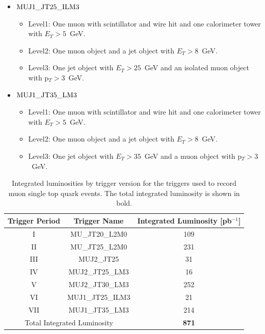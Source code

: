 \begin{itemize}
\item $\rm{MUJ1\_JT25\_ILM3}$
\begin{itemize}
\item Level1: One muon with scintillator and wire hit and one calorimeter tower with $E_{T}>5$~GeV.
\item Level2: One muon object and a jet object with $E_{T}>8$~GeV.
\item Level3: One jet object with $E_{T}>25$~GeV and an isolated muon object with p$_{T}>3$~GeV.
\end{itemize}
\item $\rm{MUJ1\_JT35\_LM3}$
\begin{itemize}
\item Level1: One muon with scintillator and wire hit and one calorimeter tower with $E_{T}>5$~GeV.
\item Level2: One muon object and a jet object with $E_{T}>8$~GeV.
\item Level3: One jet object with $E_{T}>35$~GeV and a muon object with p$_{T}>3$~GeV.
\end{itemize}
\end{itemize}

\vspace{0.2in}
\begin{table}[!h!tbp]
\begin{center}
\caption{Integrated luminosities by trigger version for the triggers used to record muon single top quark events. The total integrated luminosity is shown in bold.}
\label{muontrigger}
\begin{tabular}{cc|c}
Trigger Period	&	Trigger Name		&	Integrated Luminosity [pb$^{-1}$]	\\
\hline
I	&	MU\_JT20\_L2M0		&	109 \\ 
II	&	MU\_JT25\_L2M0		&	231 \\ 
III	&	MUJ2\_JT25			&	31 \\
IV	&	MUJ2\_JT25\_LM3		&	16 \\
V	&	MUJ2\_JT30\_LM3		&	252 \\
VI	&	MUJ1\_JT25\_ILM3		&	21 \\
VII	&	MUJ1\_JT35\_LM3		&	214 \\
\hline
\multicolumn{2}{c|}{Total Integrated Luminosity}
                                   &  {\bf 871} \\
\end{tabular}
\vspace{-0.1 in}
\end{center}
\end{table}


